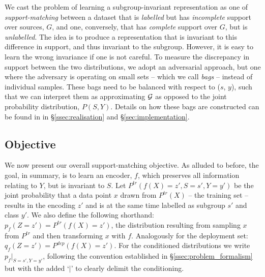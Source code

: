 

We cast the problem of learning a subgroup-invariant representation as one of
\emph{support-matching} between a dataset that is \emph{labelled} but has \emph{incomplete} support
over sources, $G$, and one, conversely, that has \emph{complete} support over $G$, but is
\emph{unlabelled}. 
%
The idea is to produce a representation that is invariant to this difference in support, and thus
invariant to the subgroup. However, it is easy to learn the wrong invariance if one is not careful.
To measure the discrepancy in support between the two distributions, we adopt an adversarial
approach, but one where the adversary is operating on small sets -- which we call \emph{bags} --
instead of individual samples. These bags need to be balanced with respect to ($s$, $y$), such that
we can interpret them as approximating ${\mathcal{G}}$ as opposed to the joint probability distribution,
$P(S, Y)$.
%
Details on how these bags are constructed can be found in in \S\ref{ssec:realisation}
and \S\ref{sec:implementation}.


\subsection{Objective}\label{ssec:objective}
%
We now present our overall support-matching objective. 
%
As alluded to before, the goal, in summary, is to learn an encoder, \(f\), which
preserves all information relating to $Y$, but is invariant to $S$. 
Let \(P^{tr}(f(X)=z', S=s',Y=y')\) be the joint probability that a data point \(x\) drawn
from \(P^{tr}(X)\) -- the training set -- results in the encoding \(z'\) and is at the same
time labelled as subgroup \(s'\) and class \(y'\). 
%
We also define the following shorthand: $p_f(Z=z')=P^{tr}(f(X)=z')$, the distribution
resulting from sampling \(x\) from \(P^{tr}\) and then transforming \(x\) with \(f\).
%
Analogously for the deployment set: $q_f(Z=z')=P^{dep}(f(X)=z')$. 
%
For the conditioned distributions we write $p_f|_{S=s',Y=y'}$, following the convention established
in \S\ref{ssec:problem_formalism} but with the added `\(|\)' to clearly delimit the
conditioning.

